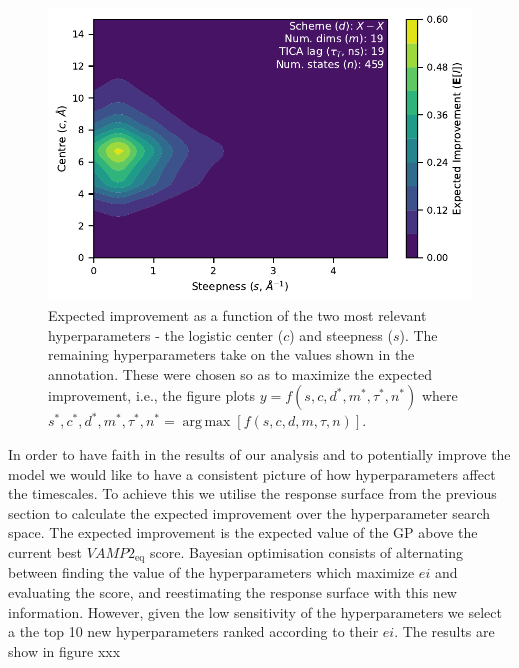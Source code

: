 \documentclass[journal=jacsat,manuscript=article]{achemso}
\DeclareMathOperator*{\argmax}{arg\,max}
\begin{document}
\begin{figure}
    \centering
    \includegraphics{figures/surface_distances_logistic_ei.pdf}
    \caption{Expected improvement as a function of the two most relevant hyperparameters - the logistic center ($c$) and steepness ($s$). The remaining hyperparameters take on the values shown in the annotation. These were chosen so as to maximize the expected improvement, i.e., the figure plots $y=f(s, c, d^{*}, m^{*}, \tau^{*}, n^{*})$ where $s^{*}, c^{*}, d^{*}, m^{*}, \tau^{*}, n^{*} = \argmax \left [f(s, c, d, m, \tau,n)\right]$. }
    \label{fig:ei_surface}
\end{figure}

In order to have faith in the results of our analysis and to potentially improve the model we would like to have a consistent picture of how hyperparameters affect the timescales.  To achieve this we utilise the response surface from the previous section to calculate the expected improvement over the hyperparameter search space.  The expected improvement is the expected value of the GP above the current best $VAMP2_{\mathrm{eq}}$ score.  Bayesian optimisation consists of alternating between finding the value of the hyperparameters which maximize $ei$ and evaluating the score, and reestimating the response surface with this new information.  However, given the low sensitivity of the hyperparameters we select a the top 10  new hyperparameters ranked according to their $ei$.  The results are show in figure xxx
\end{document}
